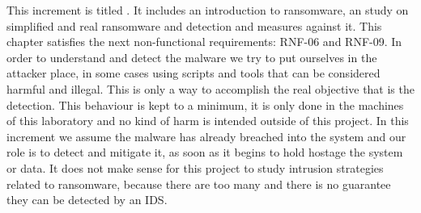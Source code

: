 This increment is titled \textit{\IncrementoTres}.
It includes an introduction to ransomware, an study on simplified and real ransomware and detection and measures against it.
This chapter satisfies the next non-functional requirements: RNF-06 and RNF-09.
\linej
\linej
In order to understand and detect the malware we try to put ourselves in the attacker place, in some cases using scripts and tools that can be considered harmful and illegal.
This is only a way to accomplish the real objective that is the detection.
This behaviour is kept to a minimum, it is only done in the machines of this laboratory and no kind of harm is intended outside of this project.
\linej
\linej
In this increment we assume the malware has already breached into the system and our role is to detect and mitigate it, as soon as it begins to hold hostage the system or data.
It does not make sense for this project to study intrusion strategies related to ransomware, because there are too many and there is no guarantee they can be detected by an IDS.

